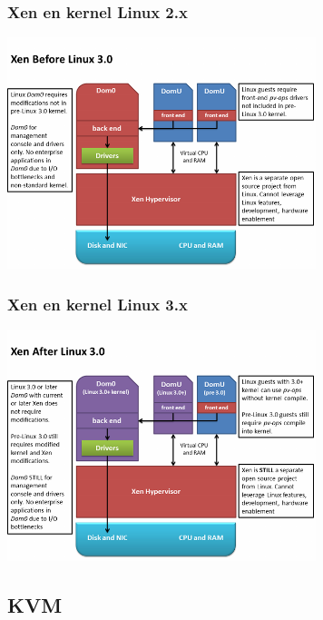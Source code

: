 \documentclass{beamer}
\begin{document}

\begin{frame}
\frametitle{Xen en kernel Linux 2.x}
\begin{center}
\includegraphics[width=9cm]{figs/xen-old-kernels.png}
\end{center}
\end{frame}


\begin{frame}
\frametitle{Xen en kernel Linux 3.x}
\begin{center}
\includegraphics[width=9cm]{figs/xen-new-kernel.png}
\end{center}
\end{frame}



\subsection{KVM}
\end{document}
